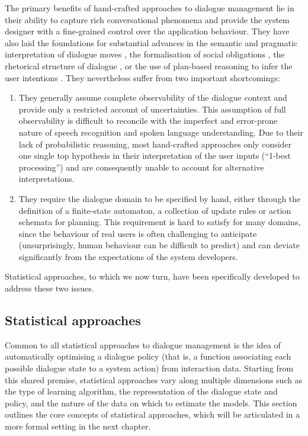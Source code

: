 The primary benefits of hand-crafted approaches to dialogue management lie in their ability to capture rich conversational phenomena and provide the system designer with a fine-grained control over the application behaviour.  They have also laid the foundations for substantial advances in the semantic and pragmatic interpretation of dialogue moves \citep{ThomasonManuscript-THOEUA,Ginzburg2012}, the formalisation of social obligations \citep{Traum:1994}, the rhetorical structure of dialogue \citep{0521659515}, or the use of plan-based reasoning to infer the user intentions \citep{Allen1980,Litman87}.  They nevertheless suffer from two important shortcomings: \begin{enumerate}
\item They generally assume complete observability of the dialogue context and provide only a restricted account of uncertainties. This assumption of full observability is difficult to reconcile with the imperfect and error-prone nature of speech recognition and spoken language understanding.  Due to their lack of probabilistic reasoning, most hand-crafted approaches only consider one single top hypothesis in their interpretation of the user inputs (``1-best processing'') and are consequently unable to account for alternative interpretations.

\item They require the dialogue domain to be specified by hand, either through the definition of a finite-state automaton, a collection of update rules or action schemata for planning.  This requirement is hard to satisfy for many domains, since the behaviour of real users is often challenging to anticipate (unsurprisingly, human behaviour can be difficult to predict) and can deviate significantly from the expectations of the system developers. 
\end{enumerate}

Statistical approaches, to which we now turn, have been specifically developed to address these two issues.

\subsection{Statistical approaches}
\label{sec:statistical}

Common to all statistical approaches to dialogue management is the idea of automatically optimising a dialogue policy (that is, a function associating each possible dialogue state to a system action) from interaction data.  Starting from this shared premise, statistical approaches vary along multiple dimensions such as the type of learning algorithm, the representation of the dialogue state and policy, and the nature of the data on which to estimate the models. This section outlines the core concepts of statistical approaches, which will be articulated in a more formal setting in the next chapter. 

